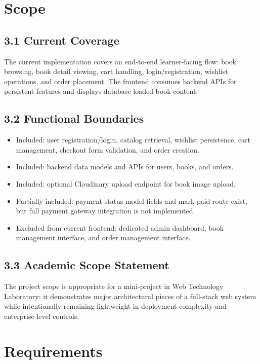 \documentclass[12pt,a4paper]{report}
\begin{document}
\chapter{Scope}
\section*{3.1 Current Coverage}
The current implementation covers an end-to-end learner-facing flow: book browsing, book detail viewing, cart handling, login/registration, wishlist operations, and order placement. The frontend consumes backend APIs for persistent features and displays database-loaded book content.

\section*{3.2 Functional Boundaries}
\begin{itemize}
    \item Included: user registration/login, catalog retrieval, wishlist persistence, cart management, checkout form validation, and order creation.
    \item Included: backend data models and APIs for users, books, and orders.
    \item Included: optional Cloudinary upload endpoint for book image upload.
    \item Partially included: payment status model fields and mark-paid route exist, but full payment gateway integration is not implemented.
    \item Excluded from current frontend: dedicated admin dashboard, book management interface, and order management interface.
\end{itemize}

\section*{3.3 Academic Scope Statement}
The project scope is appropriate for a mini-project in Web Technology Laboratory: it demonstrates major architectural pieces of a full-stack web system while intentionally remaining lightweight in deployment complexity and enterprise-level controls.

\chapter{Requirements}
\end{document}
